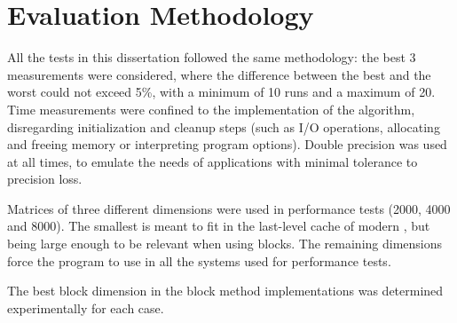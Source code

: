 \documentclass[../thesis]{subfiles}
\begin{document}
	\section{Evaluation Methodology}
	\label{sec:case:method}

	All the tests in this dissertation followed the same methodology: the best 3 measurements were considered, where the difference between the best and the worst could not exceed 5\%, with a minimum of 10 runs and a maximum of 20. Time measurements were confined to the implementation of the algorithm, disregarding initialization and cleanup steps (such as I/O operations, allocating and freeing memory or interpreting program options). Double precision was used at all times, to emulate the needs of applications with minimal tolerance to precision loss.

	Matrices of three different dimensions were used in performance tests (2000, 4000 and 8000). The smallest is meant to fit in the last-level cache of modern \cpus, but being large enough to be relevant when using blocks. The remaining dimensions force the program to use \dram in all the systems used for performance tests.

	The best block dimension in the block method implementations was determined experimentally for each case.
\end{document}
